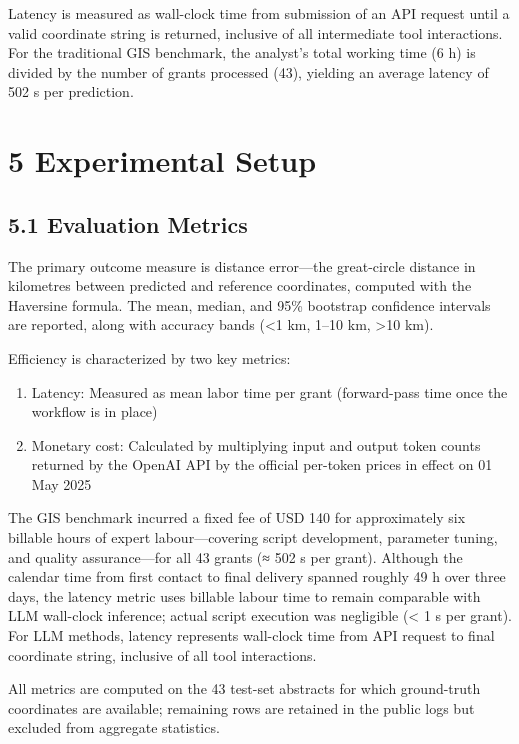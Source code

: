 \documentclass[
  10pt]{article}
\providecommand{\tightlist}{%
  \setlength{\itemsep}{0pt}\setlength{\parskip}{0pt}}
\begin{document}
Latency is measured as wall-clock time from submission of an API request
until a valid coordinate string is returned, inclusive of all
intermediate tool interactions. For the traditional GIS benchmark, the
analyst's total working time (6 h) is divided by the number of grants
processed (43), yielding an average latency of 502 s per prediction.

\section{5 Experimental Setup}\label{experimental-setup}

\subsection{5.1 Evaluation Metrics}\label{evaluation-metrics}

The primary outcome measure is distance error---the great-circle
distance in kilometres between predicted and reference coordinates,
computed with the Haversine formula. The mean, median, and 95\%
bootstrap confidence intervals are reported, along with accuracy bands
(\textless1 km, 1--10 km, \textgreater10 km).

Efficiency is characterized by two key metrics:

\begin{enumerate}
\def\labelenumi{\arabic{enumi}.}
\tightlist
\item
  Latency: Measured as mean labor time per grant (forward-pass time once
  the workflow is in place)
\item
  Monetary cost: Calculated by multiplying input and output token counts
  returned by the OpenAI API by the official per-token prices in effect
  on 01 May 2025
\end{enumerate}

The GIS benchmark incurred a fixed fee of USD 140 for approximately six
billable hours of expert labour---covering script development, parameter
tuning, and quality assurance---for all 43 grants (≈ 502 s per grant).
Although the calendar time from first contact to final delivery spanned
roughly 49 h over three days, the latency metric uses billable labour
time to remain comparable with LLM wall-clock inference; actual script
execution was negligible (\textless{} 1 s per grant). For LLM methods,
latency represents wall-clock time from API request to final coordinate
string, inclusive of all tool interactions.

All metrics are computed on the 43 test-set abstracts for which
ground-truth coordinates are available; remaining rows are retained in
the public logs but excluded from aggregate statistics.
\end{document}
